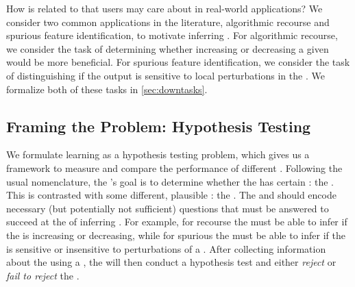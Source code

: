 How is \countmodbehaviourname{} related to \downtasknames{} that users may care about in real-world applications?
%
We consider two common applications in the literature, algorithmic recourse and spurious feature identification, to motivate inferring \countmodbehaviourname{}. 
%
For algorithmic recourse, we consider the task of determining whether increasing or decreasing a given \covname{} would be more beneficial.
For spurious feature identification, we consider the task of distinguishing if the \modelname{} output is sensitive to local perturbations in the \covname{}.
%
%
%
%
We formalize both of these tasks in \cref{sec:downtasks}.

\subsection{Framing the Problem: Hypothesis Testing}\label{sec:hypothesis-defs}

%
%
%

%
%
%

We formulate learning \countmodbehaviourname{} as a hypothesis testing problem, which gives us a framework to measure and compare the performance of different \fielddefnames{}.
%
Following the usual nomenclature, the \pracname{}'s goal is to determine whether the \modelname{} has certain \behaviourname{}: the \emph{\nullname{}}.
This \behaviourname{} is contrasted with some different, plausible \modbehaviourname{}: the \emph{\altname{}}.
The \nullname{} and \altname{} should encode necessary (but potentially not sufficient) questions that must be answered to succeed at the \taskname{} of inferring \countmodbehaviourname{}.
For example, for recourse the \username{} must be able to infer if the \modelname{} is increasing or decreasing, while for spurious \covnames{} the \username{} must be able to infer if the \modelname{} is sensitive or insensitive to perturbations of a \covname{}.
After collecting information about the \modelname{} using a \fielddefname{}, the \pracname{} will then conduct a hypothesis test and either \emph{reject} or \emph{fail to reject} the \nullname{}. 

%
%
%

